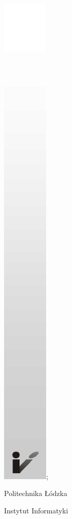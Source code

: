 {\begin{titlepage}
{\includegraphics[height=24.6cm, width=2.2cm]{img/0-title/pl_left_img.png}};
%
    \begin{adjustwidth}{0cm}{0pt}
    \begin{flushleft}
        \vspace*{-0.35cm}
        {\selectfont\Large
        Politechnika \L{}\'odzka}
        
        {\selectfont\normalsize
        \textcolor{politechniczny}{Instytut Informatyki}}
    \end{flushleft}
    \end{adjustwidth}
    

\end{titlepage}}
